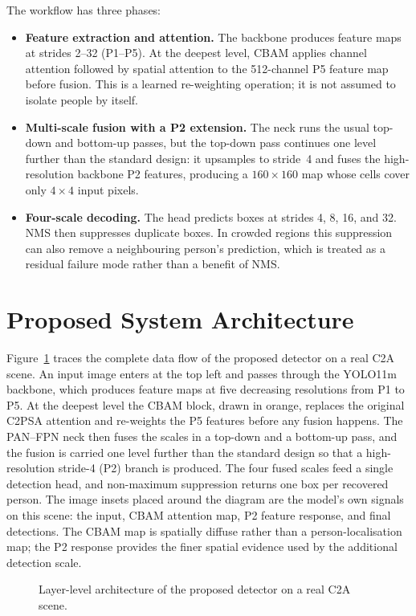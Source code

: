 The workflow has three phases:
\begin{itemize}
  \item \textbf{Feature extraction and attention.} The backbone produces feature
  maps at strides 2--32 (P1--P5). At the deepest level, CBAM applies channel
  attention followed by spatial attention to the 512-channel P5 feature map
  before fusion. This is a learned re-weighting operation; it is not assumed to
  isolate people by itself.
  \item \textbf{Multi-scale fusion with a P2 extension.} The neck runs the usual
  top-down and bottom-up passes, but the top-down pass continues one level
  further than the standard design: it upsamples to stride~4 and fuses the
  high-resolution backbone P2 features, producing a $160 \times 160$ map whose
  cells cover only $4 \times 4$ input pixels.
  \item \textbf{Four-scale decoding.} The head predicts boxes at strides 4, 8,
  16, and 32. NMS then suppresses duplicate boxes. In crowded regions this
  suppression can also remove a neighbouring person's prediction, which is
  treated as a residual failure mode rather than a benefit of NMS.
\end{itemize}

\section{Proposed System Architecture}
Figure~\ref{fig:fullarch} traces the complete data flow of the proposed
detector on a real C2A scene. An input image enters at the top left and passes
through the YOLO11m backbone, which produces feature maps at five decreasing
resolutions from P1 to P5. At the deepest level the CBAM block, drawn in
orange, replaces the original C2PSA attention and re-weights the P5 features
before any fusion happens. The PAN--FPN neck then fuses the scales in a
top-down and a bottom-up pass, and the fusion is carried one level further than
the standard design so that a high-resolution stride-4 (P2) branch is produced.
The four fused scales feed a single detection head, and non-maximum suppression
returns one box per recovered person. The image insets placed around the
  diagram are the model's own signals on this scene: the input, CBAM attention
  map, P2 feature response, and final detections. The CBAM map is spatially
  diffuse rather than a person-localisation map; the P2 response provides the
  finer spatial evidence used by the additional detection scale.

\begin{figure}[tbp]
  \centering
  \caption{Layer-level architecture of the proposed detector on a real C2A scene.}
  \label{fig:fullarch}
\end{figure}

